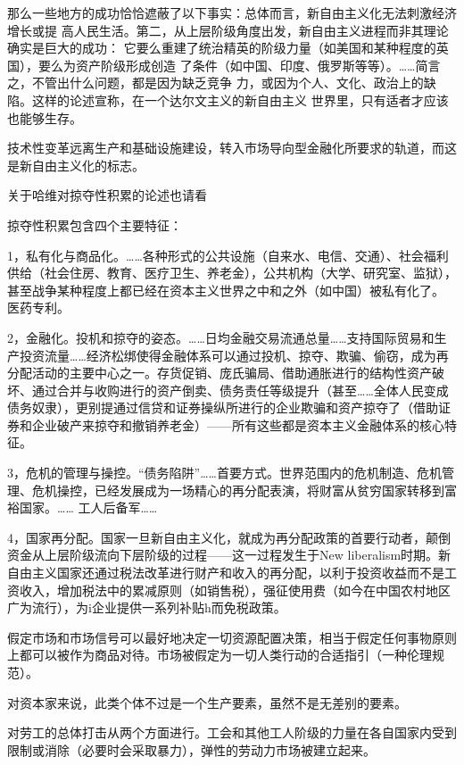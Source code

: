 那么一些地方的成功恰恰遮蔽了以下事实：总体而言，新自由主义化无法刺激经济增长或提
高人民生活。第二，从上层阶级角度出发，新自由主义进程而非其理论确实是巨大的成功：
它要么重建了统治精英的阶级力量（如美国和某种程度的英国），要么为资产阶级形成创造
了条件（如中国、印度、俄罗斯等等）。……简言之，不管出什么问题，都是因为缺乏竞争
力，或因为个人、文化、政治上的缺陷。这样的论述宣称，在一个达尔文主义的新自由主义
世界里，只有适者才应该也能够生存。

技术性变革远离生产和基础设施建设，转入市场导向型金融化所要求的轨道，而这是新自由主义化的标志。

关于哈维对掠夺性积累的论述也请看

掠夺性积累包含四个主要特征：

1，私有化与商品化。……各种形式的公共设施（自来水、电信、交通）、社会福利供给（社会住房、教育、医疗卫生、养老金），公共机构（大学、研究室、监狱），甚至战争某种程度上都已经在资本主义世界之中和之外（如中国）被私有化了。 医药专利。

2，金融化。投机和掠夺的姿态。……日均金融交易流通总量……支持国际贸易和生产投资流量……经济松绑使得金融体系可以通过投机、掠夺、欺骗、偷窃，成为再分配活动的主要中心之一。存货促销、庞氏骗局、借助通胀进行的结构性资产破坏、通过合并与收购进行的资产倒卖、债务责任等级提升（甚至……全体人民变成债务奴隶），更别提通过信贷和证券操纵所进行的企业欺骗和资产掠夺了（借助证券和企业破产来掠夺和撤销养老金）——所有这些都是资本主义金融体系的核心特征。

3，危机的管理与操控。“债务陷阱”……首要方式。世界范围内的危机制造、危机管理、危机操控，已经发展成为一场精心的再分配表演，将财富从贫穷国家转移到富裕国家。…… 工人后备军……

4，国家再分配。国家一旦新自由主义化，就成为再分配政策的首要行动者，颠倒资金从上层阶级流向下层阶级的过程——这一过程发生于New liberalism时期。新自由主义国家还通过税法改革进行财产和收入的再分配，以利于投资收益而不是工资收入，增加税法中的累减原则（如销售税），强征使用费（如今在中国农村地区广为流行），为i企业提供一系列补贴h而免税政策。

假定市场和市场信号可以最好地决定一切资源配置决策，相当于假定任何事物原则上都可以被作为商品对待。市场被假定为一切人类行动的合适指引（一种伦理规范）。

对资本家来说，此类个体不过是一个生产要素，虽然不是无差别的要素。

对劳工的总体打击从两个方面进行。工会和其他工人阶级的力量在各自国家内受到限制或消除（必要时会采取暴力），弹性的劳动力市场被建立起来。

